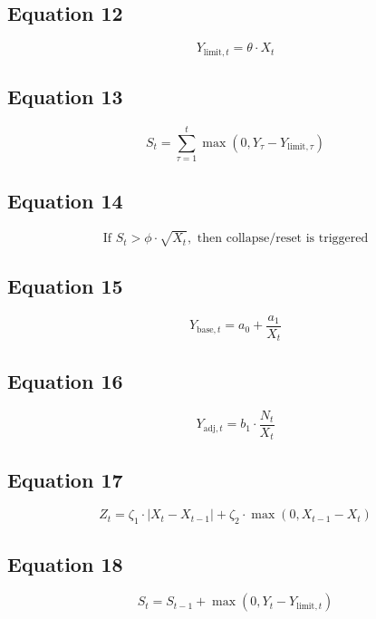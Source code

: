 \documentclass[12pt]{article}
\begin{document}
\subsection*{Equation 12}
\begin{equation}
Y_{\text{limit},t} = \theta \cdot X_t
\end{equation}

\subsection*{Equation 13}
\begin{equation}
S_t = \sum_{\tau=1}^{t} \max(0, Y_\tau - Y_{\text{limit},\tau})
\end{equation}

\subsection*{Equation 14}
\begin{equation}
\text{If } S_t > \phi \cdot \sqrt{X_t}, \text{ then collapse/reset is triggered}
\end{equation}

\subsection*{Equation 15}
\begin{equation}
Y_{\text{base},t} = a_0 + \frac{a_1}{X_t}
\end{equation}

\subsection*{Equation 16}
\begin{equation}
Y_{\text{adj},t} = b_1 \cdot \frac{N_t}{X_t}
\end{equation}

\subsection*{Equation 17}
\begin{equation}
Z_t = \zeta_1 \cdot |X_t - X_{t-1}| + \zeta_2 \cdot \max(0, X_{t-1} - X_t)
\end{equation}

\subsection*{Equation 18}
\begin{equation}
S_t = S_{t-1} + \max(0, Y_t - Y_{\text{limit},t})
\end{equation}
\end{document}
